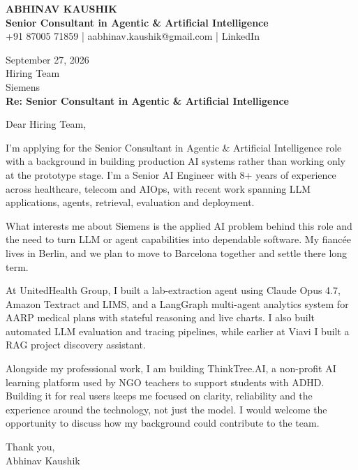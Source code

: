 \documentclass[10pt,a4paper]{article}
\begin{document}
\begin{center}
{\Large\bfseries ABHINAV KAUSHIK}\\[2pt]
{\bfseries Senior Consultant in Agentic \& Artificial Intelligence}\\[2pt]
+91 87005 71859 \quad | \quad aabhinav.kaushik@gmail.com \quad | \quad LinkedIn
\end{center}
\vspace{8pt}
September 27, 2026\\[6pt]
Hiring Team\\
Siemens\\[4pt]
\textbf{Re: Senior Consultant in Agentic \& Artificial Intelligence}

Dear Hiring Team,

I’m applying for the Senior Consultant in Agentic \& Artificial Intelligence role with a background in building production AI systems rather than working only at the prototype stage. I’m a Senior AI Engineer with 8+ years of experience across healthcare, telecom and AIOps, with recent work spanning LLM applications, agents, retrieval, evaluation and deployment.

What interests me about Siemens is the applied AI problem behind this role and the need to turn LLM or agent capabilities into dependable software. My fiancée lives in Berlin, and we plan to move to Barcelona together and settle there long term.

At UnitedHealth Group, I built a lab-extraction agent using Claude Opus 4.7, Amazon Textract and LIMS, and a LangGraph multi-agent analytics system for AARP medical plans with stateful reasoning and live charts. I also built automated LLM evaluation and tracing pipelines, while earlier at Viavi I built a RAG project discovery assistant.

Alongside my professional work, I am building ThinkTree.AI, a non-profit AI learning platform used by NGO teachers to support students with ADHD. Building it for real users keeps me focused on clarity, reliability and the experience around the technology, not just the model. I would welcome the opportunity to discuss how my background could contribute to the team.

Thank you,\\
Abhinav Kaushik
\end{document}
